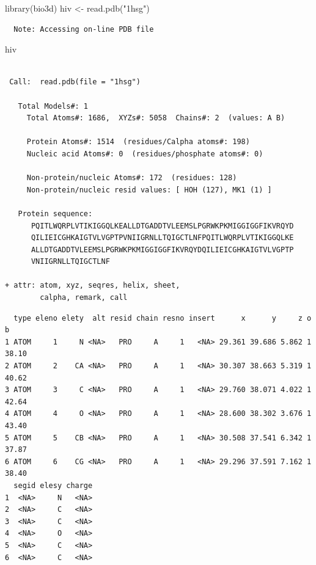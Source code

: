 \documentclass[
  letterpaper,
  DIV=11,
  numbers=noendperiod]{scrartcl}
\newenvironment{Shaded}{\begin{snugshade}}{\end{snugshade}}
\newcommand{\FunctionTok}[1]{\textcolor[rgb]{0.28,0.35,0.67}{#1}}
\newcommand{\NormalTok}[1]{\textcolor[rgb]{0.00,0.23,0.31}{#1}}
\newcommand{\OtherTok}[1]{\textcolor[rgb]{0.00,0.23,0.31}{#1}}
\newcommand{\SpecialCharTok}[1]{\textcolor[rgb]{0.37,0.37,0.37}{#1}}
\newcommand{\StringTok}[1]{\textcolor[rgb]{0.13,0.47,0.30}{#1}}
\begin{document}
\begin{Shaded}
\begin{Highlighting}[]
\FunctionTok{library}\NormalTok{(bio3d)}
\NormalTok{hiv }\OtherTok{\textless{}{-}} \FunctionTok{read.pdb}\NormalTok{(}\StringTok{"1hsg"}\NormalTok{)}
\end{Highlighting}
\end{Shaded}

\begin{verbatim}
  Note: Accessing on-line PDB file
\end{verbatim}

\begin{Shaded}
\begin{Highlighting}[]
\NormalTok{hiv}
\end{Highlighting}
\end{Shaded}

\begin{verbatim}

 Call:  read.pdb(file = "1hsg")

   Total Models#: 1
     Total Atoms#: 1686,  XYZs#: 5058  Chains#: 2  (values: A B)

     Protein Atoms#: 1514  (residues/Calpha atoms#: 198)
     Nucleic acid Atoms#: 0  (residues/phosphate atoms#: 0)

     Non-protein/nucleic Atoms#: 172  (residues: 128)
     Non-protein/nucleic resid values: [ HOH (127), MK1 (1) ]

   Protein sequence:
      PQITLWQRPLVTIKIGGQLKEALLDTGADDTVLEEMSLPGRWKPKMIGGIGGFIKVRQYD
      QILIEICGHKAIGTVLVGPTPVNIIGRNLLTQIGCTLNFPQITLWQRPLVTIKIGGQLKE
      ALLDTGADDTVLEEMSLPGRWKPKMIGGIGGFIKVRQYDQILIEICGHKAIGTVLVGPTP
      VNIIGRNLLTQIGCTLNF

+ attr: atom, xyz, seqres, helix, sheet,
        calpha, remark, call
\end{verbatim}

\begin{Shaded}
\end{Shaded}

\begin{verbatim}
  type eleno elety  alt resid chain resno insert      x      y     z o     b
1 ATOM     1     N <NA>   PRO     A     1   <NA> 29.361 39.686 5.862 1 38.10
2 ATOM     2    CA <NA>   PRO     A     1   <NA> 30.307 38.663 5.319 1 40.62
3 ATOM     3     C <NA>   PRO     A     1   <NA> 29.760 38.071 4.022 1 42.64
4 ATOM     4     O <NA>   PRO     A     1   <NA> 28.600 38.302 3.676 1 43.40
5 ATOM     5    CB <NA>   PRO     A     1   <NA> 30.508 37.541 6.342 1 37.87
6 ATOM     6    CG <NA>   PRO     A     1   <NA> 29.296 37.591 7.162 1 38.40
  segid elesy charge
1  <NA>     N   <NA>
2  <NA>     C   <NA>
3  <NA>     C   <NA>
4  <NA>     O   <NA>
5  <NA>     C   <NA>
6  <NA>     C   <NA>
\end{verbatim}
\end{document}
